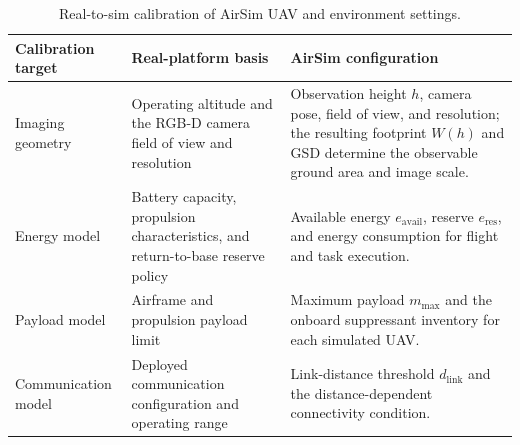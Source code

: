 \begin{table}[t]
    \centering
    \caption{Real-to-sim calibration of AirSim UAV and environment settings.}
    \label{tab:real_to_sim_calibration}
    \footnotesize
    \setlength{\tabcolsep}{5pt}
    \renewcommand{\arraystretch}{1.25}
    \begin{tabularx}{\textwidth}{
        @{}
        >{\raggedright\arraybackslash}p{2.7cm}
        >{\raggedright\arraybackslash}p{4.4cm}
        >{\raggedright\arraybackslash}X
        @{}
    }
        \toprule
        \textbf{Calibration target} &
        \textbf{Real-platform basis} &
        \textbf{AirSim configuration} \\
        \midrule
        Imaging geometry &
        Operating altitude and the RGB-D camera field of view and resolution &
        Observation height $h$, camera pose, field of view, and resolution; the resulting footprint $W(h)$ and GSD determine the observable ground area and image scale. \\

        Energy model &
        Battery capacity, propulsion characteristics, and return-to-base reserve policy &
        Available energy $e_{\mathrm{avail}}$, reserve $e_{\mathrm{res}}$, and energy consumption for flight and task execution. \\

        Payload model &
        Airframe and propulsion payload limit &
        Maximum payload $m_{\max}$ and the onboard suppressant inventory for each simulated UAV. \\

        Communication model &
        Deployed communication configuration and operating range &
        Link-distance threshold $d_{\mathrm{link}}$ and the distance-dependent connectivity condition. \\
        \bottomrule
    \end{tabularx}
\end{table}
